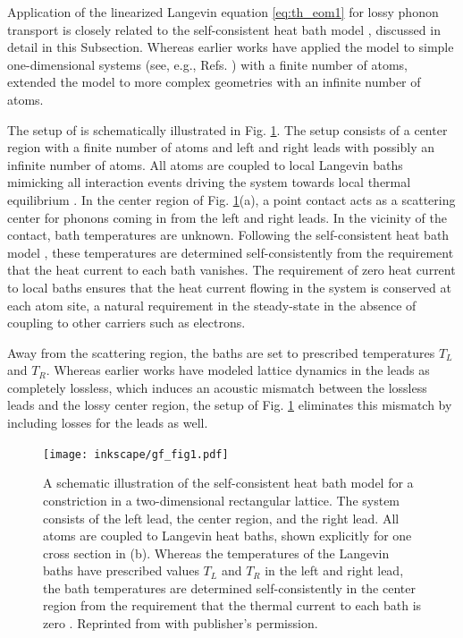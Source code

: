 Application of the linearized Langevin equation \eqref{eq:th_eom1} for lossy phonon transport is closely related to the self-consistent heat bath model \cite{bolsterli70}, discussed in detail in this Subsection. Whereas earlier works have applied the model to simple one-dimensional systems (see, e.g., Refs. \cite{bolsterli70,visscher75,dhar03,dhar06,segal09,bandyopadhyay11}) with a finite number of atoms,  extended the model to more complex geometries with an infinite number of atoms.  

The setup of  is schematically illustrated in Fig. \ref{fig:schb_setup}. The setup consists of a center region with a finite number of atoms and left and right leads with possibly an infinite number of atoms. All atoms are coupled to local Langevin baths mimicking all interaction events driving the system towards local thermal equilibrium \cite{bolsterli70}. In the center region of Fig. \ref{fig:schb_setup}(a), a point contact acts as a scattering center for phonons coming in from the left and right leads. In the vicinity of the contact, bath temperatures are unknown. Following the self-consistent heat bath model \cite{bolsterli70}, these temperatures are determined self-consistently from the requirement that the heat current to each bath vanishes. The requirement of zero heat current to local baths ensures that the heat current flowing in the system is conserved at each atom site, a natural requirement in the steady-state in the absence of coupling to other carriers such as electrons.

Away from the scattering region, the baths are set to prescribed temperatures $T_L$ and $T_R$. Whereas earlier works \cite{dhar06} have modeled lattice dynamics in the leads as completely lossless, which induces an acoustic mismatch between the lossless leads and the lossy center region, the setup of Fig. \ref{fig:schb_setup} eliminates this mismatch by including losses for the leads as well.  

\begin{figure}
\begin{center}
 \texttt{[image: inkscape/gf\_fig1.pdf]}
 \caption{A schematic illustration of the self-consistent heat bath model for a constriction in a two-dimensional rectangular lattice. The system consists of the left lead, the center region, and the right lead. All atoms are coupled to Langevin heat baths, shown explicitly for one cross section in (b). Whereas the temperatures of the Langevin baths have prescribed values $T_L$ and $T_R$ in the left and right lead, the bath temperatures are determined self-consistently in the center region from the requirement that the thermal current to each bath is zero \cite{bolsterli70}. Reprinted from  with publisher's permission.}
\label{fig:schb_setup}
\end{center}
\end{figure} 

